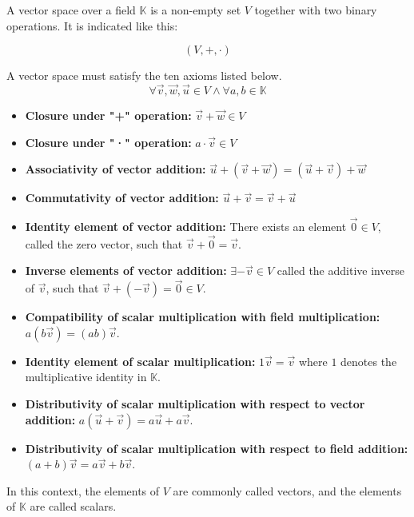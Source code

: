 \begin{tcolorbox}[colback=def_color,colframe=gray] \begin{definition}
    A vector space over a field \(\mathbb K\) is a non-empty set \(V\) together with two binary operations. It is indicated like this:
    
    $$
    (V, +, \cdot)
    $$
    
    A vector space must satisfy the ten axioms listed below.
    {\large$$\forall \vec v, \vec w, \vec u \in V \land \forall a, b \in \mathbb K$$}

    \begin{itemize}
    \item \textbf{Closure under "+" operation:}
        $\vec v + \vec w \in V$
    \item \textbf{Closure under "·" operation:}
        $a \cdot \vec v \in V$
    \item \textbf{Associativity of vector addition:} $\vec{u} + (\vec{v} + \vec{w}) = (\vec{u} + \vec{v}) + \vec{w}$
    \item \textbf{Commutativity of vector addition:} $\vec{u} + \vec{v} = \vec{v} + \vec{u}$
    \item \textbf{Identity element of vector addition:} There exists an element $\vec{0} \in V$, called the zero vector, such that $\vec{v} + \vec{0} = \vec{v}$.
    \item \textbf{Inverse elements of vector addition:} $\exists -\vec{v} \in V$ called the additive inverse of $\vec{v}$, such that $\vec{v} + (-\vec{v}) = \vec{0} \in V$.
    \item \textbf{Compatibility of scalar multiplication with field multiplication:} $a(b\vec{v}) = (ab)\vec{v}$.
    \item \textbf{Identity element of scalar multiplication:} $1\vec{v} = \vec{v}$ where $1$ denotes the multiplicative identity in $\mathbb K$.
    \item \textbf{Distributivity of scalar multiplication with respect to vector addition:} $a(\vec{u} + \vec{v}) = a\vec{u} + a\vec{v}$.
    \item \textbf{Distributivity of scalar multiplication with respect to field addition:} $(a + b)\vec{v} = a\vec{v} + b\vec{v}$.
    \end{itemize}

    In this context, the elements of \(V\) are commonly called vectors, and the elements of \(\mathbb K\) are called scalars.
\end{definition}
\end{tcolorbox}

